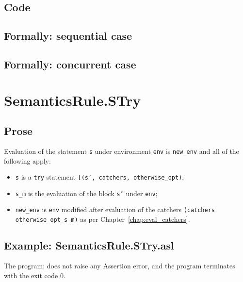 \documentclass{book}
\begin{document}
  \subsection{Code}

\begin{emptyformal}
  \subsection{Formally: sequential case}

  \subsection{Formally: concurrent case}
\end{emptyformal}


\section{SemanticsRule.STry \label{sec:SemanticsRule.STry}}

    \subsection{Prose}
  Evaluation of the statement \texttt{s} under environment \texttt{env} is
\texttt{new\_env} and all of the following apply:
    \begin{itemize}
    \item \texttt{s} is a \texttt{try} statement \texttt{[(s', catchers, otherwise\_opt)};
    \item \texttt{s\_m} is the evaluation of the block \texttt{s'} under \texttt{env};
    \item \texttt{new\_env} is \texttt{env} modified after evaluation of the catchers \texttt{(catchers
      otherwise\_opt s\_m)} as per Chapter~\ref{chap:eval_catchers}.
    \end{itemize}

    \subsection{Example: SemanticsRule.STry.asl}
    The program:
    does not raise any Assertion error, and the program terminates with the exit code 0.
\end{document}
